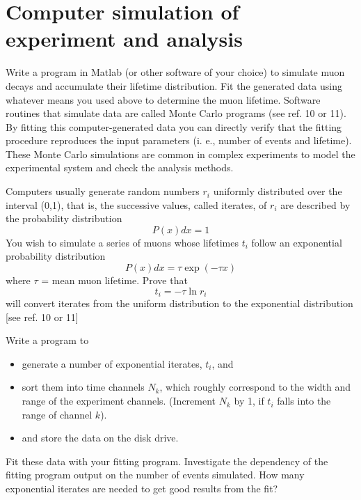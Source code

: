 \documentclass{../lab}
\begin{document}
\section{Computer simulation of experiment and analysis}

Write a program in Matlab (or other software of your choice) to simulate muon decays and accumulate their lifetime distribution. Fit the generated data using whatever means you used above to determine the muon lifetime. Software routines that simulate data are called Monte Carlo programs (see ref. 10 or 11). By fitting this computer-generated data you can directly verify that the fitting procedure reproduces the input parameters (i. e., number of events and lifetime). These Monte Carlo simulations are common in complex experiments to model the experimental system and check the analysis methods.

Computers usually generate random numbers $r_i$ uniformly distributed over the interval (0,1), that is, the successive values, called iterates, of $r_i$ are described by the probability distribution
\begin{equation}
    P(x)dx = 1
\end{equation}
You wish to simulate a series of muons whose lifetimes $t_i$ follow an exponential probability distribution
\begin{equation}
    P(x)dx = \tau\exp(-\tau x)
\end{equation}
where $\tau$ = mean muon lifetime. Prove that
\begin{equation}
    t_i=-\tau \ln r_i
\end{equation}
will convert iterates from the uniform distribution to the exponential distribution [see ref. 10 or 11]

Write a program to

\begin{itemize}
    \item generate a number of exponential iterates, $t_i$, and

    \item sort them into time channels $N_k$, which roughly correspond to the width and range of the experiment channels. (Increment $N_k$ by 1, if $t_i$ falls into the range of channel $k$).

    \item and store the data on the disk drive.
\end{itemize}

Fit these data with your fitting program. Investigate the dependency of the fitting program output on the number of events simulated. How many exponential iterates are needed to get good results from the fit?
\end{document}
